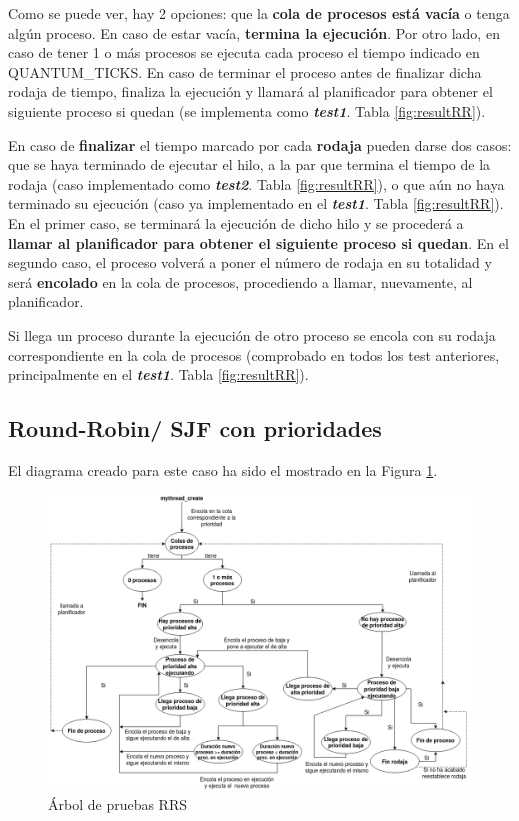 \documentclass[10pt, spanish, pdftex]{template/UC3M_document}
\begin{document}
Como se puede ver, hay 2 opciones: que la \textbf{cola de procesos está vacía} o tenga algún proceso. En caso de estar vacía, \textbf{termina la ejecución}. Por otro lado, en caso de tener 1 o más procesos se ejecuta cada proceso el tiempo indicado en QUANTUM\_TICKS. En caso de terminar el proceso antes de finalizar dicha rodaja de tiempo, finaliza la ejecución y llamará al planificador para obtener el siguiente proceso si quedan (se implementa como \textbf{\textit{test1}}. Tabla \ref{fig:resultRR}).  

En caso de \textbf{finalizar} el tiempo marcado por cada \textbf{rodaja} pueden darse dos casos: que se haya terminado de ejecutar el hilo, a la par que termina el tiempo de la rodaja (caso implementado como \textbf{\textit{test2}}. Tabla \ref{fig:resultRR}), o que aún no haya terminado su ejecución (caso ya implementado en el \textbf{\textit{test1}}. Tabla \ref{fig:resultRR}). En el primer caso, se terminará la ejecución de dicho hilo y se procederá a \textbf{llamar al planificador para obtener el siguiente proceso si quedan}. En el segundo caso, el proceso volverá a poner el número de rodaja en su totalidad y será \textbf{encolado} en la cola de procesos, procediendo a llamar, nuevamente, al planificador.

Si llega un proceso durante la ejecución de otro proceso se encola con su rodaja correspondiente en la cola de procesos (comprobado en todos los test anteriores, principalmente en el \textbf{\textit{test1}}. Tabla \ref{fig:resultRR}).

\subsection{Round-Robin/ SJF con prioridades}
El diagrama creado para este caso ha sido el mostrado en la Figura \ref{fig:testRRS}.
\vspace{0.5cm}
\begin{figure}[h]
    \centering
    \includegraphics[width=14cm]{arboles/testRRS.png}
    \caption{Árbol de pruebas RRS}
    \label{fig:testRRS}
\end{figure}
\end{document}
